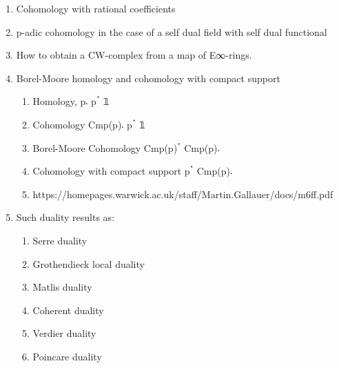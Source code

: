 \documentclass{book}
\begin{document}
\begin{enumerate}
\item Cohomology with rational coefficients
\item p-adic cohomology in the case of a self dual field with self dual functional
\item How to obtain a CW-complex from a map of E∞-rings.
\item Borel-Moore homology and cohomology with compact support
\begin{enumerate}
\item Homology, p𛲔 pॱ 𝟙
\item Cohomology Cmp(p)𛲔 pॱ 𝟙
\item Borel-Moore Cohomology Cmp(p)ॱ Cmp(p)𛲔
\item Cohomology with compact support pॱ Cmp(p)𛲔
\item https://homepages.warwick.ac.uk/staff/Martin.Gallauer/docs/m6ff.pdf
\end{enumerate}
\item Such duality results as:
\begin{enumerate}
\item Serre duality
\item Grothendieck local duality
\item Matlis duality
\item Coherent duality
\item Verdier duality
\item Poincare duality
\end{enumerate}
\end{enumerate}
\end{document}

